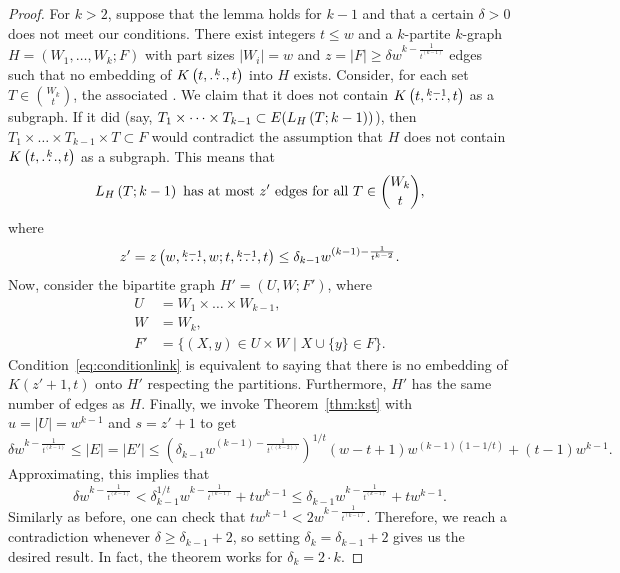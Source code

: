 \begin{lemma}
\begin{proof}
        For $k > 2$, suppose that the lemma holds for $k - 1$ and that
        a certain $\delta > 0$ does not meet our conditions.
        There exist integers $t \leq w$ and a $k$-partite $k$-graph $H=(W_1, \dots, W_k; F)$
        with part sizes $|W_i| = w$ and $z = |F| \geq \delta w^{k - \frac{1}{t^{(k-1)}}}$ edges
        such that no embedding of $K\left(t, \overset{k}{\dots}, t\right)$ into $H$ exists.
        Consider, for each set $T \in \binom{W_k}{t}$, the associated 
        .
        We claim that it does not contain $K\left(t, \overset{k-1}{\dots}, t\right)$ as a subgraph.
        If it did (say, $T_1 \times \dots \times T_{k-1} \subset E(L_{H}\left(T; k-1\right))$),
        then $T_1 \times \dots \times T_{k-1} \times T \subset F$
        would contradict the assumption that $H$ does not contain $K\left(t, \overset{k}{\dots}, t\right)$ as a subgraph.
        This means that
        \begin{equation} \label{eq:conditionlink}
            L_{H}\left(T; k-1\right) \text{ has at most $z'$ edges for all } T \in \binom{W_k}{t},
        \end{equation}
        where
        \[
            z' = z\left(w, \overset{k-1}{\dots}, w; t, \overset{k-1}{\dots}, t\right) \leq \delta_{k-1} w^{(k - 1) - \frac{1}{t^{k-2}}}.
        \]
        Now, consider the bipartite graph $H' = (U, W; F')$, where
        \begin{align*}
            U &= W_1 \times \dots \times W_{k-1}, \\
            W &= W_k, \\
            F' &= \{(X, y) \in U \times W \mid X \cup \{y\} \in F\}.
        \end{align*}
        Condition~\eqref{eq:conditionlink} is equivalent to saying that
        there is no embedding of $K(z' + 1, t)$ onto $H'$ respecting the partitions.
        Furthermore, $H'$ has the same number of edges as $H$.
        Finally, we invoke Theorem~\ref{thm:kst} with
        ${u = |U| = w^{k-1}}$ and
        ${s = z' + 1}$ to get
        \begin{equation} \label{eq:erdos64_induction}
            \delta w^{k - \frac{1}{t^{(k-1)}}} \leq
            |E| = |E'| \leq
            \left(\delta_{k-1} w^{(k - 1) - \frac{1}{t^{((k-2))}}}\right)^{1 / t}(w - t + 1)w^{(k-1)(1 - 1 / t)} + (t - 1)w^{k-1}.
        \end{equation}
        Approximating, this implies that
        \[
            \delta w^{k - \frac{1}{t^{(k-1)}}} < \delta_{k-1}^{1 / t} w^{k - \frac{1}{t^{(k-1)}}} + tw^{k-1} \leq \delta_{k-1}w^{k - \frac{1}{t^{(k-1)}}} + tw^{k-1}.
        \]
        Similarly as before, one can check that $tw^{k-1} < 2w^{k-\frac{1}{t^{(k-1)}}}$.
        Therefore, we reach a contradiction whenever $\delta \geq \delta_{k-1} + 2$,
        so setting $\delta_k = \delta_{k-1} + 2$ gives us the desired result.
        In fact, the theorem works for $\delta_k = 2 \cdot k$.

    \end{proof}
\end{lemma}

